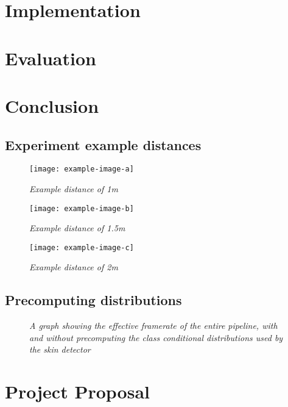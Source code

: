 \documentclass[12pt,twoside,notitlepage]{report}
\begin{document}
\chapter{Implementation}

\cleardoublepage

\chapter{Evaluation}

\cleardoublepage

\chapter{Conclusion}

\cleardoublepage



\cleardoublepage

\appendix
\section*{Experiment example distances}
\label{appendix:experiments}
\begin{figure}[H]
    \centering
    \texttt{[image: example-image-a]}
   \caption{\textit{Example distance of 1m}}
\end{figure}
\begin{figure}[H]
    \centering
    \texttt{[image: example-image-b]}
   \caption{\textit{Example distance of 1.5m} }
\end{figure}
\begin{figure}[H]
    \centering
    \texttt{[image: example-image-c]}
   \caption{\textit{Example distance of 2m} }
\end{figure}
\section*{Precomputing distributions}
\begin{figure}[H]
    \centering
    
   \caption{\textit{A graph showing the effective framerate of the entire pipeline, with and without precomputing the class conditional distributions used by the skin detector}} 
\end{figure}

\cleardoublepage

\chapter{Project Proposal}

\end{document}
